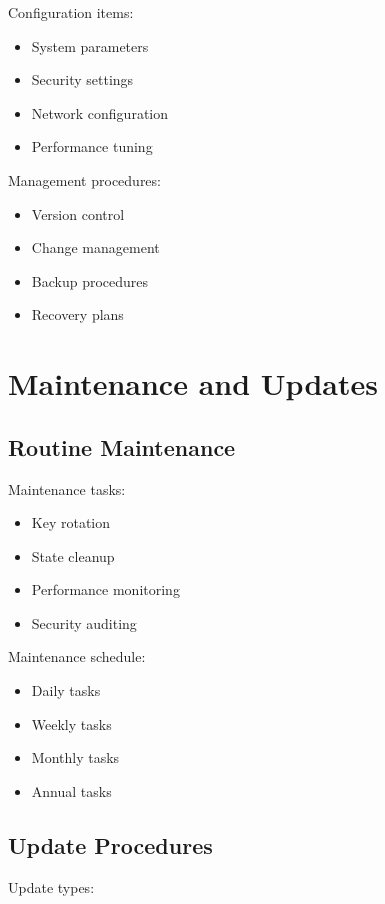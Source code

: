 \documentclass[12pt]{article}
\begin{document}
Configuration items:

\begin{itemize}
\item System parameters
\item Security settings
\item Network configuration
\item Performance tuning
\end{itemize}

Management procedures:

\begin{itemize}
\item Version control
\item Change management
\item Backup procedures
\item Recovery plans
\end{itemize}

\section{Maintenance and Updates}

\subsection{Routine Maintenance}

Maintenance tasks:

\begin{itemize}
\item Key rotation
\item State cleanup
\item Performance monitoring
\item Security auditing
\end{itemize}

Maintenance schedule:

\begin{itemize}
\item Daily tasks
\item Weekly tasks
\item Monthly tasks
\item Annual tasks
\end{itemize}

\subsection{Update Procedures}

Update types:
\end{document}
